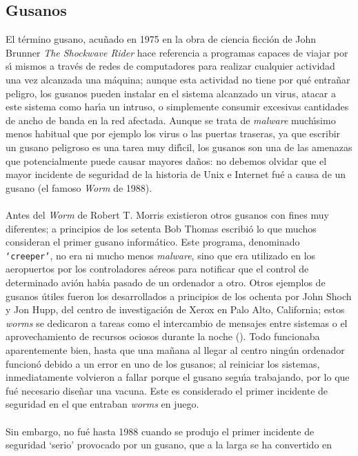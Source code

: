 \subsection{Gusanos}
El t\'ermino gusano, acu\~nado en 1975 en la obra de ciencia ficci\'on de John
Brunner {\it The Shockwave Rider} hace referencia a programas capaces de viajar 
por s\'{\i} mismos a trav\'es de 
redes de computadores para realizar cualquier actividad una vez alcanzada una 
m\'aquina; aunque esta actividad no tiene por qu\'e entra\~nar peligro, 
los gusanos pueden instalar en el sistema alcanzado un virus, atacar a este 
sistema como har\'{\i}a un intruso, o simplemente consumir excesivas cantidades
de ancho de banda en la red afectada. Aunque se trata de {\it malware} 
much\'{\i}simo menos habitual que por ejemplo los virus o las puertas traseras,
ya que escribir un gusano peligroso es una tarea muy dif\'{\i}cil, los gusanos
son una de las amenazas que potencialmente puede causar mayores da\~nos: no 
debemos olvidar que el mayor incidente de seguridad de la historia de Unix e
Internet fu\'e a causa de un gusano (el famoso {\it Worm} de 1988).\\
\\Antes del {\it Worm} de Robert T. Morris existieron otros gusanos con fines
muy diferentes; a principios de los setenta Bob Thomas escribi\'o lo que muchos
consideran el primer gusano inform\'atico. Este programa, denominado {\tt 
`creeper'}, no era ni mucho menos {\it malware}, sino que era utilizado en los 
aeropuertos por los controladores a\'ereos para notificar que el control de 
determinado avi\'on hab\'{\i}a pasado de un ordenador a otro. Otros ejemplos
de gusanos \'utiles fueron los desarrollados a principios de los ochenta por
John Shoch y Jon Hupp, del centro de investigaci\'on de Xerox en Palo Alto, 
California; estos {\it worms} se dedicaron a tareas como el intercambio de 
mensajes entre sistemas o el aprovechamiento de recursos ociosos durante la 
noche (\cite{kn:sho82}). Todo funcionaba aparentemente bien, hasta que una 
ma\~nana al llegar al
centro ning\'un ordenador funcion\'o debido a un error en uno de los gusanos;
al reiniciar los sistemas, inmediatamente volvieron a fallar porque el gusano
segu\'{\i}a trabajando, por lo que fu\'e necesario dise\~nar una vacuna. Este 
es considerado el primer incidente de seguridad en el que entraban {\it worms} 
en juego.\\
\\Sin embargo, no fu\'e hasta 1988 cuando se produjo el primer incidente de
seguridad `serio' provocado por un gusano, que a la larga se ha convertido en
